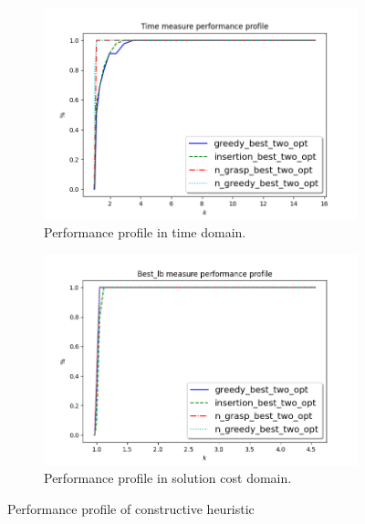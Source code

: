 \begin{figure}[!h]
	\centering
	\begin{subfigure}{.9\textwidth}
		\centering
		\includegraphics[width=\columnwidth]{../res/Lconstructives_refining_LA_time.png}
		\caption{Performance profile in time domain.}
		\label{fig:Lconstructives_refining_time}
	\end{subfigure}
	\begin{subfigure}{.9\textwidth}
		\centering
		\includegraphics[width=\columnwidth]{../res/Lconstructives_refining_LA_lb.png}
		\caption{Performance profile in solution cost domain.}
		\label{fig:Lconstructives_refining_lb}
	\end{subfigure}
	\caption{Performance profile of constructive heuristic}
	\label{fig:pp_Lconstructives_refining}
\end{figure}

